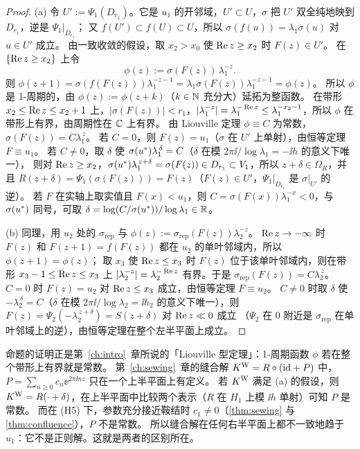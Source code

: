 \begin{proof}
(a) 令 $U':=\Psi_1(D_{r_1})$。它是 $u_1$ 的开邻域，$U'\subset U$，$\sigma$ 把 $U'$ 双全纯地映到 $D_{r_1}$，逆是 $\Psi_1|_{D_{r_1}}$；
又 $f(U')\subset f(U)\subset U$，所以 $\sigma(f(u))=\lambda_1\sigma(u)$ 对 $u\in U'$ 成立。
由一致收敛的假设，取 $x_2>x_0$ 使 $\operatorname{Re} z\ge x_2$ 时 $F(z)\in U'$。
在 $\{\operatorname{Re} z\ge x_2\}$ 上令
\[
  \phi(z):=\sigma(F(z))\,\lambda_1^{-z}.
\]
则 $\phi(z+1)=\sigma(f(F(z)))\lambda_1^{-z-1}=\lambda_1\sigma(F(z))\lambda_1^{-z-1}=\phi(z)$。
所以 $\phi$ 是 1-周期的，由 $\phi(z):=\phi(z+k)$（$k\in\mathbb{N}$ 充分大）延拓为整函数。
在带形 $x_2\le\operatorname{Re} z\le x_2+1$ 上，$|\sigma(F(z))|<r_1$，$|\lambda_1^{-z}|=\lambda_1^{-\operatorname{Re} z}\le\lambda_1^{-x_2-1}$，所以 $\phi$ 在带形上有界，由周期性在 $\mathbb{C}$ 上有界。
由 Liouville 定理 $\phi\equiv C$ 为常数，$\sigma(F(z))=C\lambda_1^{\,z}$。
若 $C=0$，则 $F(z)=u_1$（$\sigma$ 在 $U'$ 上单射），由恒等定理 $F\equiv u_1$。
若 $C\ne0$，取 $\delta$ 使 $\sigma(u^{*})\lambda_1^{\,\delta}=C$（$\delta$ 在模 $2\pi\ii/\log\lambda_1=-\ii h$ 的意义下唯一），
则对 $\operatorname{Re} z\ge x_2$，$\sigma(u^{*})\lambda_1^{\,z+\delta}=\sigma(F(z))\in D_{r_1}\subset V_1$，所以 $z+\delta\in\Omega_R$，并且
$R(z+\delta)=\Psi_1(\sigma(F(z)))=F(z)$（$F(z)\in U'$，$\Psi_1|_{D_{r_1}}$ 是 $\sigma|_{U'}$ 的逆）。
若 $F$ 在实轴上取实值且 $F(x)<u_1$，则 $C=\sigma(F(x))\lambda_1^{-x}<0$，与 $\sigma(u^{*})$ 同号，可取 $\delta=\log(C/\sigma(u^{*}))/\log\lambda_1\in\mathbb{R}$。

(b) 同理，用 $u_2$ 处的 $\sigma_{\mathrm{rep}}$ 与 $\phi(z):=\sigma_{\mathrm{rep}}(F(z))\lambda_2^{-z}$。
$\operatorname{Re} z\to-\infty$ 时 $F(z)$ 和 $F(z+1)=f(F(z))$ 都在 $u_2$ 的单叶邻域内，所以 $\phi(z+1)=\phi(z)$；
取 $x_3$ 使 $\operatorname{Re} z\le x_3$ 时 $F(z)$ 位于该单叶邻域内，则在带形 $x_3-1\le\operatorname{Re} z\le x_3$ 上 $|\lambda_2^{-z}|=\lambda_2^{-\operatorname{Re} z}$ 有界。于是 $\sigma_{\mathrm{rep}}(F(z))=C\lambda_2^{\,z}$。
$C=0$ 时 $F(z)=u_2$ 对 $\operatorname{Re} z\le x_3$ 成立，由恒等定理 $F\equiv u_2$。
$C\ne0$ 时取 $\delta$ 使 $-\lambda_2^{\,\delta}=C$（$\delta$ 在模 $2\pi\ii/\log\lambda_2=\ii h_2$ 的意义下唯一），则 $F(z)=\Psi_2(-\lambda_2^{\,z+\delta})=S(z+\delta)$ 对 $\operatorname{Re} z\ll0$ 成立
（$\Psi_2$ 在 $0$ 附近是 $\sigma_{\mathrm{rep}}$ 在单叶邻域上的逆），由恒等定理在整个左半平面上成立。
\end{proof}

\begin{remark}\label{ch2:rem:why-regular}
命题的证明正是第~\ref{ch:intro}~章所说的「Liouville 型定理」：1-周期函数 $\phi$ 若在整个带形上有界就是常数。
第~\ref{ch:sewing}~章的缝合解 $K^{\mathrm W}=R\circ(\mathrm{id}+P)$ 中，$P=\sum_{n\ge0}c_n\ee^{2\pi\ii nz}$ 只在一个上半平面上有定义。
若 $K^{\mathrm W}$ 满足 (a) 的假设，则 $K^{\mathrm W}=R(\cdot+\delta)$，在上半平面中比较两个表示（$R$ 在 $H_1$ 上模 $\ii h$ 单射）可知 $P$ 是常数。
而在 (H5) 下，参数充分接近鞍结时 $c_1\ne0$（\cref{thm:sewing} 与 \cref{thm:confluence}），$P$ 不是常数。
所以缝合解在任何右半平面上都不一致地趋于 $u_1$：它不是正则解。这就是两者的区别所在。
\end{remark}

